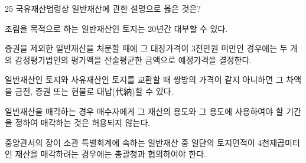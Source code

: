 \begin{question}{25}
국유재산법령상 일반재산에 관한 설명으로 옳은 것은?
\begin{choices}
  \item 조림을 목적으로 하는 일반재산인 토지는 20년간 대부할 수 있다.
  \item 증권을 제외한 일반재산을 처분할 때에 그 대장가격이 3천만원 미만인 경우에는 두 개의 감정평가법인의 평가액을 산술평균한 금액으로 예정가격을 결정한다.
  \item 일반재산인 토지와 사유재산인 토지를 교환할 때 쌍방의 가격이 같지 아니하면 그 차액을 금전, 증권 또는 현물로 대납(代納)할 수 있다.
  \item 일반재산을 매각하는 경우 매수자에게 그 재산의 용도와 그 용도에 사용하여야 할 기간을 정하여 매각하는 것은 허용되지 않는다.
  \item 중앙관서의 장이 소관 특별회계에 속하는 일반재산 중 일단의 토지면적이 4천제곱미터인 재산을 매각하려는 경우에는 총괄청과 협의하여야 한다.
\end{choices}
\end{question}
